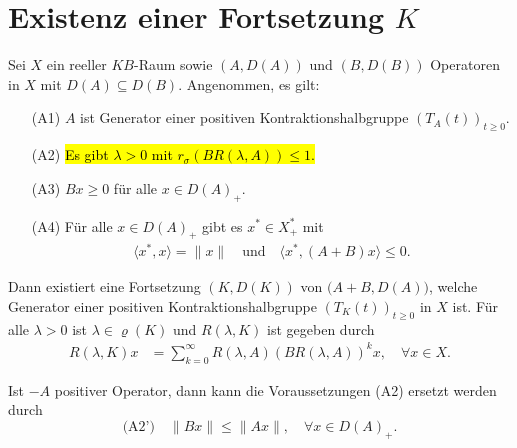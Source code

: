 \section{Existenz einer Fortsetzung $K$}


\begin{fsatz}\cite{banasiak_lachowicz_2007}\label{Hauptaussage}
Sei $X$ ein reeller $KB$-Raum sowie $(A, D(A))$ und $(B, D(B))$ Operatoren in $X$ mit $D(A)\subseteq D(B)$. Angenommen, es gilt:
\begin{enumerate}
\item[\textnormal{(A1)}] $A$ ist Generator einer positiven Kontraktionshalbgruppe  $(T_A(t))_{t\geq0}$.
\item[\textnormal{(A2)}] \hl{Es gibt $\lambda >0$ mit $r_\sigma(BR(\lambda, A))\leq1$. }
\item[\textnormal{(A3)}] $Bx\geq0$ für alle $x\in D(A)_+$.
\item[\textnormal{(A4)}] Für alle $x\in D(A)_+$ gibt es $x^*\in X^*_+$ mit  
\begin{align*}
    \langle x^*, x\rangle = \|x\|\quad\text{und}\quad \langle x^*, (A+B)x\rangle\leq 0.
\end{align*}
\end{enumerate}
Dann existiert eine Fortsetzung $(K, D(K))$ von $\big(A+B, D(A)\big)$, welche Generator einer positiven Kontraktionshalbgruppe $(T_K(t))_{t\geq0}$ in $X$ ist. Für alle $\lambda >0$ ist $\lambda\in\varrho(K)$ und $R(\lambda, K)$ ist gegeben durch
\begin{align*}\label{Darstellung der Resolvente von K}
R(\lambda, K)x
&=\sum_{k=0}^\infty R(\lambda, A)(BR(\lambda, A))^kx,\quad \forall x\in X.
\end{align*}
\end{fsatz}

\begin{bem}\label{stärkere Annahme (A2)}
Ist $-A$ positiver Operator, dann kann die Voraussetzungen (A2) ersetzt werden durch 
\begin{equation*}
\text{(A2')} \quad \|Bx\|\leq \|Ax\|,\quad \forall x\in D(A)_+.
\end{equation*}
\end{bem}

